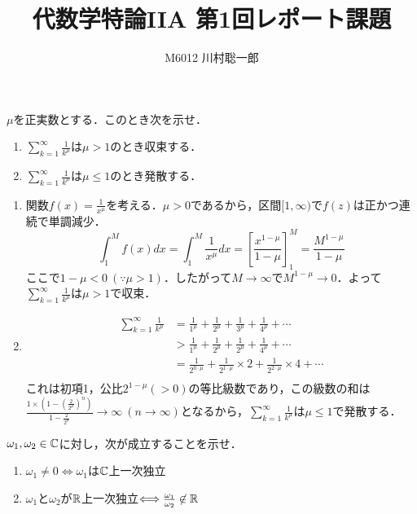 \documentclass[dvipdfmx]{jsreport}
\title{代数学特論IIA 第1回レポート課題}
\author{M6012 川村聡一郎}
\date{}
\begin{document}
\maketitle

\begin{tcolorbox}
	$\mu$を正実数とする．このとき次を示せ．
\begin{enumerate}
	\item $\sum_{k= 1}^\infty \frac{1}{k^\mu}$は$\mu> 1$のとき収束する．
	\item $\sum_{k= 1}^\infty \frac{1}{k^\mu}$は$\mu\le 1$のとき発散する．
\end{enumerate}
\end{tcolorbox}

\begin{souanswer}
\begin{enumerate}
	\item 関数$f(x)= \frac{1}{x^\mu}$を考える．$\mu> 0$であるから，区間$[1, \infty)$で$f(z)$は正かつ連続で単調減少．
\begin{equation*}
	\int_1^M f(x)dx= \int_1^M \frac{1}{x^\mu} dx= \left[\frac{x^{1- \mu}}{1- \mu}\right]_1^M= \frac{M^{1- \mu}}{1- \mu}
\end{equation*}
	ここで$1- \mu< 0\ (\because \mu> 1)$．したがって$M\to \infty$で$M^{1- \mu}\to 0$．よって$\sum_{k= 1}^\infty \frac{1}{k^\mu}$は$\mu> 1$で収束．
	
	\item 
\begin{align*}
	\sum_{k= 1}^\infty \frac{1}{k^\mu}
	&= \frac{1}{1^\mu}+ \frac{1}{2^\mu}+ \frac{1}{3^\mu}+ \frac{1}{4^\mu}+ \cdots\\
	&> \frac{1}{1^\mu}+ \frac{1}{2^\mu}+ \frac{1}{2^\mu}+ \frac{1}{4^\mu}+ \cdots\\
	&= \frac{1}{2^{0\cdot \mu}}+ \frac{1}{2^{1\cdot \mu}}\times 2+ \frac{1}{2^{2\cdot \mu}}\times 4+ \cdots\\
\end{align*}
	これは初項1，公比$2^{1- \mu}(> 0)$の等比級数であり，この級数の和は$\frac{1\times\left(1- \left(\frac{2}{2^\mu}\right)^n\right)}{1- \frac{2}{2^\mu}}\to \infty\ (n\to \infty)$となるから，$\sum_{k= 1}^\infty \frac{1}{k^\mu}$は$\mu\le 1$で発散する．
\end{enumerate}	
\end{souanswer}


\begin{tcolorbox}
	$\omega_1, \omega_2\in \mathbb{C}$に対し，次が成立することを示せ．
\begin{enumerate}
	\item $\omega_1\ne 0\Longleftrightarrow \omega_1$は$\mathbb{C}$上一次独立
	\item $\omega_1$と$\omega_2$が$\mathbb{R}$上一次独立$\Longleftrightarrow \frac{\omega_1}{\omega_2}\not\in \mathbb{R}$
\end{enumerate}
\end{tcolorbox}
\end{document}
